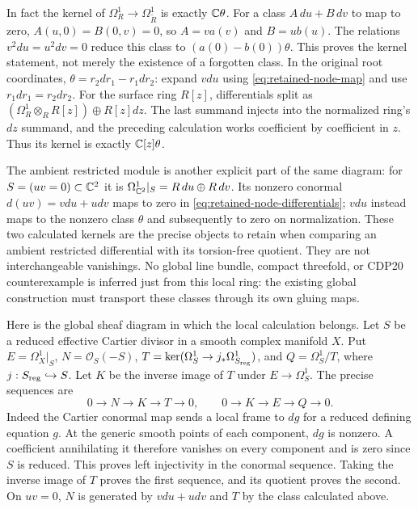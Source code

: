In fact the kernel of $\Omega_R^1\to\Omega_{\widetilde R}^1$
is exactly $\mathbb C\theta$. For a class $A\,du+B\,dv$ to map to zero,
$A(u,0)=B(0,v)=0$, so $A=va(v)$ and $B=ub(u)$.
The relations $v^2du=u^2dv=0$ reduce this class to
$(a(0)-b(0))\theta$. This proves the kernel statement, not merely
the existence of a forgotten class. In the original root coordinates,
$\theta=r_2dr_1-r_1dr_2$: expand $vdu$ using
\eqref{eq:retained-node-map} and use $r_1dr_1=r_2dr_2$.
For the surface ring $R[z]$, differentials split as
$(\Omega_R^1\otimes_R R[z])\oplus R[z]dz$.
The last summand injects into the normalized ring's $dz$ summand,
and the preceding calculation works coefficient by coefficient in $z$.
Thus its kernel is exactly $\mathbb C[z]\theta$.

The ambient restricted module is another explicit part of the same
diagram: for $S=(uv=0)\subset\mathbb C^2$ it is
$\Omega_{\mathbb C^2}^1|_S=R\,du\oplus R\,dv$.
Its nonzero conormal $d(uv)=vdu+udv$ maps to zero in
\eqref{eq:retained-node-differentials}; $vdu$ instead maps to the
nonzero class $\theta$ and subsequently to zero on normalization.
These two calculated kernels are the precise objects to retain when
comparing an ambient restricted differential with its torsion-free
quotient. They are not interchangeable vanishings. No global line
bundle, compact threefold, or CDP20 counterexample is inferred just
from this local ring: the existing global construction must transport
these classes through its own gluing maps.

Here is the global sheaf diagram in which the local calculation belongs.
Let $S$ be a reduced effective Cartier divisor in a smooth complex
manifold $X$. Put $E=\Omega_X^1|_S$, $N=\mathcal O_S(-S)$,
$T=\ker(\Omega_S^1\to j_*\Omega_{S_{\rm reg}}^1)$, and
$Q=\Omega_S^1/T$, where $j:S_{\rm reg}\hookrightarrow S$.
Let $K$ be the inverse image of $T$ under $E\to\Omega_S^1$.
The precise sequences are
\begin{equation}
 0\longrightarrow N\longrightarrow K\longrightarrow T\longrightarrow0,
 \qquad
 0\longrightarrow K\longrightarrow E\longrightarrow Q\longrightarrow0.
 \label{eq:retained-cdp-filtration}
\end{equation}
Indeed the Cartier conormal map sends a local frame to $dg$ for
a reduced defining equation $g$. At the generic smooth points of
each component, $dg$ is nonzero. A coefficient annihilating it
therefore vanishes on every component and is zero since $S$ is reduced.
This proves left injectivity in the conormal sequence. Taking the
inverse image of $T$ proves the first sequence, and its quotient proves
the second. On $uv=0$, $N$ is generated by $vdu+udv$ and $T$ by
the class calculated above.

